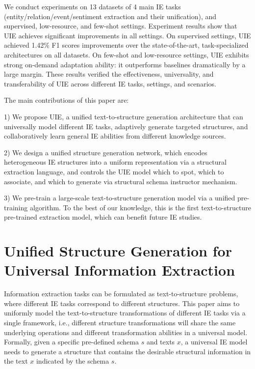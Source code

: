 \documentclass[11pt]{article}
\begin{document}
We conduct experiments on 13 datasets of 4 main IE tasks (entity/relation/event/sentiment extraction and their unification), and supervised, low-resource, and few-shot settings.
Experiment results show that UIE achieves significant improvements in all settings.
On supervised settings, UIE achieved 1.42\% F1 scores improvements over the state-of-the-art, task-specialized architectures on all datasets.
On few-shot and low-resource settings, UIE exhibits strong on-demand adaptation ability: it outperforms baselines dramatically by a large margin.
These results verified the effectiveness,  universality, and transferability of UIE across different IE tasks, settings, and scenarios.

The main contributions of this paper are:

  1) We propose UIE, a unified text-to-structure generation architecture that can universally model different IE tasks, adaptively generate targeted structures, and collaboratively learn general IE abilities from different knowledge sources. 
  
  2) We design a unified structure generation network, which encodes heterogeneous IE structures into a uniform representation via a structural extraction language, and controls the UIE model which to spot, which to associate, and which to generate via structural schema instructor mechanism.
  
  3) We pre-train a large-scale text-to-structure generation model via a unified pre-training algorithm. 
  To the best of our knowledge, this is the first text-to-structure pre-trained extraction model, which can benefit future IE studies.
 
\section{Unified Structure Generation for Universal Information Extraction} \label{sec:unified}

Information extraction tasks can be formulated as text-to-structure problems, where different IE tasks correspond to different structures.
This paper aims to uniformly model the text-to-structure transformations of different IE tasks via a single framework, i.e., different structure transformations will share the same underlying operations and different transformation abilities in a universal model.
Formally, given a specific pre-defined schema $s$ and texts $x$, a universal IE model needs to generate a structure that contains the desirable structural information in the text $x$ indicated by the schema $s$.
\end{document}
